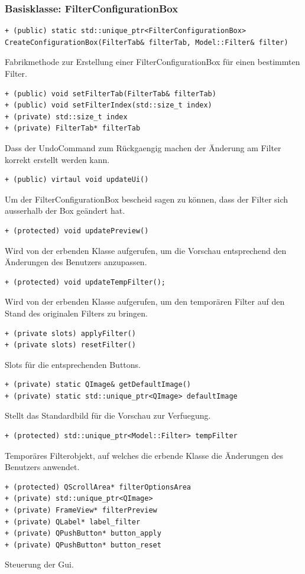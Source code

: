 \documentclass{scrartcl}
\begin{document}
{\subsubsection{Basisklasse: FilterConfigurationBox}
\bigskip
\begin{verbatim}
+ (public) static std::unique_ptr<FilterConfigurationBox>
CreateConfigurationBox(FilterTab& filterTab, Model::Filter& filter)
\end{verbatim}
Fabrikmethode zur Erstellung einer FilterConfigurationBox für einen bestimmten Filter.
\bigskip
\begin{verbatim}
+ (public) void setFilterTab(FilterTab& filterTab)
+ (public) void setFilterIndex(std::size_t index)
+ (private) std::size_t index
+ (private) FilterTab* filterTab
\end{verbatim}
Dass der UndoCommand zum Rückgaengig machen der Änderung am Filter korrekt erstellt werden kann.
\bigskip
\begin{verbatim}
+ (public) virtaul void updateUi()
\end{verbatim}
Um der FilterConfigurationBox bescheid sagen zu können, dass der Filter sich ausserhalb der Box geändert hat.
\bigskip
\begin{verbatim}
+ (protected) void updatePreview()
\end{verbatim}
Wird von der erbenden Klasse aufgerufen, um die Vorschau entsprechend den Änderungen des Benutzers anzupassen.
\bigskip
\begin{verbatim}
+ (protected) void updateTempFilter();
\end{verbatim}
Wird von der erbenden Klasse aufgerufen, um den temporären Filter auf den Stand des originalen Filters zu bringen.
\bigskip
\begin{verbatim}
+ (private slots) applyFilter()
+ (private slots) resetFilter()
\end{verbatim}
Slots für die entsprechenden Buttons.
\bigskip
\begin{verbatim}
+ (private) static QImage& getDefaultImage()
+ (private) static std::unique_ptr<QImage> defaultImage
\end{verbatim}
Stellt das Standardbild für die Vorschau zur Verfuegung.
\bigskip
\begin{verbatim}
+ (protected) std::unique_ptr<Model::Filter> tempFilter
\end{verbatim}
Temporäres Filterobjekt, auf welches die erbende Klasse die Änderungen des Benutzers anwendet.
\bigskip
\begin{verbatim}
+ (protected) QScrollArea* filterOptionsArea
+ (private) std::unique_ptr<QImage>
+ (private) FrameView* filterPreview
+ (private) QLabel* label_filter
+ (private) QPushButton* button_apply
+ (private) QPushButton* button_reset
\end{verbatim}
Steuerung der Gui.
\bigskip
}
\end{document}
